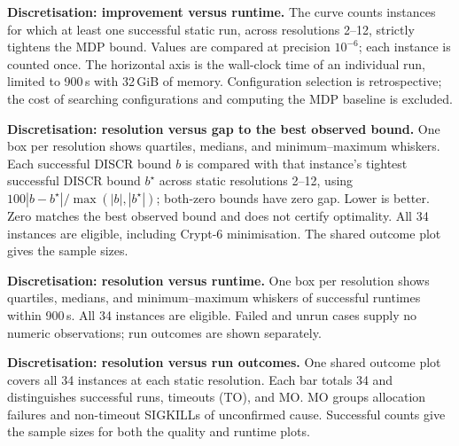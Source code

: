 \documentclass[fontsize=10pt,paper=b5,twoside,DIV=11,BCOR=9mm,
    headinclude=true,footinclude=false]{scrartcl}
\newcommand{\checktable}[1]{%
  \par\begingroup\centering
    \par
  \endgroup\clearpage
}
\newcommand{\checkplot}[3]{%
  \par\begingroup\centering
    {\footnotesize #2}\par\medskip
    \parbox{\linewidth}{\small\textbf{#1} #3\par}%
  \endgroup\clearpage
}
\begin{document}
\checktable{tables-general/tablebenchmarks.tex}
\checktable{tables-general/tableprbmin.tex}
\checktable{tables-general/tableprbmax.tex}
\checktable{tables-general/tablerewmin.tex}
\checktable{tables-general/tablerewmax.tex}
\checktable{tables-general/overapprox/tableoverapproxprbmin.tex}
\checktable{tables-general/overapprox/tableoverapproxprbmax.tex}
\checktable{tables-general/overapprox/tableoverapproxrewmin.tex}
\checktable{tables-general/overapprox/tableoverapproxrewmax.tex}
\checktable{tables-general/underapprox/tableunderapproxprbmin.tex}
\checktable{tables-general/underapprox/tableunderapproxprbmax.tex}
\checktable{tables-general/underapprox/tableunderapproxrewmin.tex}
\checktable{tables-general/underapprox/tableunderapproxrewmax.tex}
\checkplot{Discretisation: improvement versus runtime.}{%
}{%
  The curve counts instances for which at least one successful static run,
  across resolutions 2--12, strictly tightens the MDP bound. Values are compared at
  precision $10^{-6}$; each instance is counted once. The horizontal axis
  is the wall-clock time of an individual run, limited to 900\,s with 32\,GiB
  of memory. Configuration
  selection is retrospective; the cost of searching configurations and computing
  the MDP baseline is excluded.
}
\checkplot{Discretisation: resolution versus gap to the best observed bound.}{%
}{%
  One box per resolution shows quartiles,
  medians, and minimum--maximum whiskers. Each successful DISCR bound $b$ is
  compared with that instance's tightest successful DISCR bound $b^\star$
  across static resolutions 2--12, using
  $100|b-b^\star|/\max(|b|,|b^\star|)$; both-zero bounds have zero gap.
  Lower is better. Zero matches the best observed bound and does not certify
  optimality. All 34 instances are eligible, including Crypt-6 minimisation.
  The shared outcome plot gives the sample sizes.
}
\checkplot{Discretisation: resolution versus runtime.}{%
}{%
  One box per resolution shows quartiles,
  medians, and minimum--maximum whiskers of successful runtimes within 900\,s.
  All 34 instances are eligible. Failed and unrun cases supply no numeric
  observations; run outcomes are shown separately.
}
\checkplot{Discretisation: resolution versus run outcomes.}{%
}{%
  One shared outcome plot covers all 34 instances at each static resolution. Each bar
  totals 34 and distinguishes successful runs, timeouts (TO), and MO. MO groups
  allocation failures and non-timeout SIGKILLs of unconfirmed cause. Successful
  counts give the sample sizes for both the quality and runtime plots.
}
\end{document}
